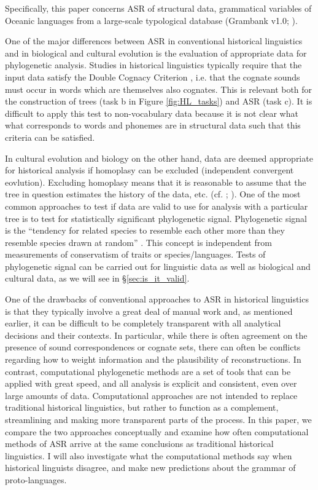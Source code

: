 \documentclass[12pt,letterpaper]{article}
\begin{document}
Specifically, this paper concerns ASR of structural data, grammatical variables of Oceanic languages from a large-scale typological database (Grambank v1.0; \citealt{grambank_release}). 

One of the major differences between ASR in conventional historical linguistics and in biological and cultural evolution is the evaluation of appropriate data for phylogenetic analysis. Studies in historical linguistics typically require that the input data satisfy the Double Cognacy Criterion \citep{walkden_2013}, i.e. that the cognate sounds must occur in words which are themselves also cognates. This is relevant both for the construction of trees (task b in Figure \ref{fig:HL_tasks}) and ASR (task c). It is difficult to apply this test to non-vocabulary data because it is not clear what what corresponds to words and phonemes are in structural data such that this criteria can be satisfied. 

In cultural evolution and biology on the other hand, data are deemed appropriate for historical analysis if homoplasy can be excluded (independent convergent eovlution). Excluding homoplasy means that it is reasonable to assume that the tree in question estimates the history of the data, etc. (cf. \citealt{holland2020accuracy}; \citealt{evans2021uses}). One of the most common approaches to test if data are valid to use for analysis with a particular tree is to test for statistically significant phylogenetic signal. Phylogenetic signal is the ``tendency for related species to resemble each other more than they resemble species drawn at random'' \citep[905]{blomberg2002tempo}. This concept is independent from measurements of conservatism of traits or species/languages. Tests of phylogenetic signal can be carried out for linguistic data as well as biological and cultural data, as we will see in §\ref{sec:is_it_valid}.

One of the drawbacks of conventional approaches to ASR in historical linguistics is that they typically involve a great deal of manual work and, as mentioned earlier, it can be difficult to be completely transparent with all analytical decisions and their contexts. In particular, while there is often agreement on the presence of sound correspondences or cognate sets, there can often be conflicts regarding how to weight information and the plausibility of reconstructions. In contrast, computational phylogenetic methods are a set of tools that can be applied with great speed, and all analysis is explicit and consistent, even over large amounts of data. Computational approaches are not intended to replace traditional historical linguistics, but rather to function as a complement, streamlining and making more transparent parts of the process. In this paper, we compare the two approaches conceptually and examine how often computational methods of ASR arrive at the same conclusions as traditional historical linguistics. I will also investigate what the computational methods say when historical linguists disagree, and make new predictions about the grammar of proto-languages.
\end{document}
